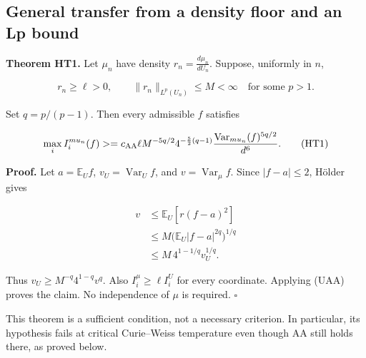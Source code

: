 \subsection{General transfer from a density floor and an Lp bound}\label{ht:general-transfer-from-a-density-floor-and-an-lp-bound}

\textbf{Theorem HT1.} Let \(\mu_n\) have density \(r_n=\frac{d\mu_n}{dU_n}\). Suppose, uniformly in \(n\),

\[
 r_n\ge\ell>0,\qquad \|r_n\|_{L^p(U_n)}\le M<\infty
 \quad\text{for some }p>1.
\]

Set \(q=p/(p-1)\). Then every admissible \(f\) satisfies

\[
 \max_i I_i^{\mu_n}(f)
 \ge c_{\rm AA}\ell M^{-5q/2}
       4^{-\frac52(q-1)}
       \frac{\operatorname{Var}_{\mu_n}(f)^{5q/2}}{d^6}.
 \tag{HT1}
\]

\textbf{Proof.} Let \(a=\mathbb E_U f\), \(v_U=\operatorname{Var}_U f\), and \(v=\operatorname{Var}_\mu f\). Since \(|f-a|\le 2\), Hölder gives

\[
\begin{aligned}
v&\le \mathbb E_U[r(f-a)^2]\\
 &\le M\big(\mathbb E_U |f-a|^{2q}\big)^{1/q}\\
 &\le M\,4^{1-1/q}v_U^{1/q}.
\end{aligned}
\]

Thus \(v_U\ge M^{-q}4^{1-q}v^q\). Also \(I_i^\mu\ge \ell I_i^U\) for every coordinate. Applying (UAA) proves the claim. No independence of \(\mu\) is required. \(\square\)

This theorem is a sufficient condition, not a necessary criterion. In particular, its hypothesis fails at critical Curie--Weiss temperature even though AA still holds there, as proved below.
